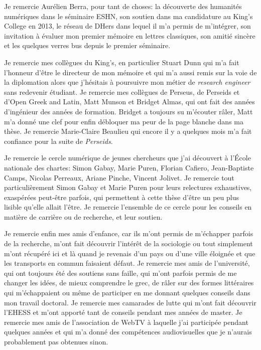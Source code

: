 Je remercie Aurélien Berra, pour tant de choses: la découverte des humanités numériques dans le séminaire ESHN, son soutien dans ma candidature au King's College en 2013, le réseau de DHers dans lequel il m'a permis de m'intégrer, son invitation à évaluer mon premier mémoire en lettres classiques, son amitié sincère et les quelques verres bus depuis le premier séminaire.

Je remercie mes collègues du King's, en particulier Stuart Dunn qui m'a fait l'honneur d'être le directeur de mon mémoire et qui m'a aussi remis sur la voie de la diplomation alors que j'hésitais à poursuivre mon métier de \textit{research engineer} sans redevenir étudiant. Je remercie mes collègues de Perseus, de Perseids et d'Open Greek and Latin, Matt Munson et Bridget Almas, qui ont fait des années d'ingénieur des années de formation. Bridget a toujours su m'écouter râler, Matt m'a donné une clef pour enfin débloquer ma peur de la page blanche dans ma thèse. Je remercie Marie-Claire Beaulieu qui encore il y a quelques mois m'a fait confiance pour la suite de \textit{Perseids}.

Je remercie le cercle numérique de jeunes chercheurs que j'ai découvert à l'École nationale des chartes: Simon Gabay, Marie Puren, Florian Cafiero, Jean-Baptiste Camps, Nicolas Perreaux, Ariane Pinche, Vincent Jolivet. Je remercie tout particulièrement Simon Gabay et Marie Puren pour leurs relectures exhaustives, exaspérées peut-être parfois, qui permettent à cette thèse d'être un peu plus lisible qu'elle allait l'être. Je remercie l'ensemble de ce cercle pour les conseils en matière de carrière ou de recherche, et leur soutien.

Je remercie enfin mes amis d'enfance, car ils m'ont permis de m'échapper parfois de la recherche, m'ont fait découvrir l'intérêt de la sociologie ou tout simplement m'ont récupéré ici et là quand je revenais d'un pays ou d'une ville éloignée et que les transports en commun faisaient défaut. Je remercie mes amis de l'université, qui ont toujours été des soutiens sans faille, qui m'ont parfois permis de me changer les idées, de mieux comprendre le grec, de râler sur des formes littéraires qui m'échappaient ou même de participer en me donnant quelques conseils dans mon travail doctoral. Je remercie mes camarades de lutte qui m'ont fait découvrir l'EHESS et m'ont apporté tant de conseils pendant mes années de master. Je remercie mes amis de l'association de WebTV à laquelle j'ai participée pendant quelques années et qui m'a donné des compétences audiovisuelles que je n'aurais probablement pas obtenues sinon.


